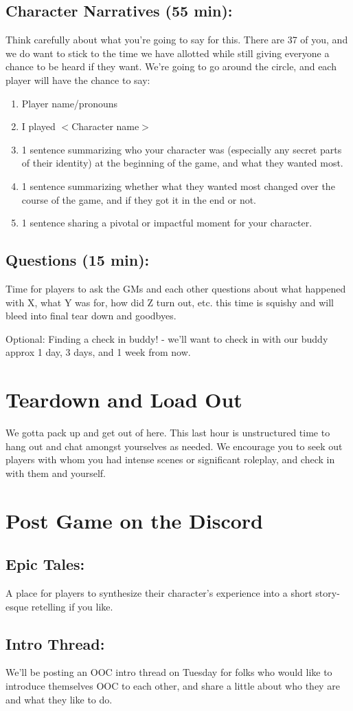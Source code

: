\documentclass[green]{GL2020}
\begin{document}
\subsection*{Character Narratives (55 min):}
Think carefully about what you’re going to say for this. There are 37 of you, and we do want to stick to the time we have allotted while still giving everyone a chance to be heard if they want. We’re going to go around the circle, and each player will have the chance to say:
\begin{enumerate}
	\item Player name/pronouns
	\item I played $<$Character name$>$
	\item 1 sentence summarizing who your character was (especially any secret parts of their identity) at the beginning of the game, and what they wanted most.
	\item 1 sentence summarizing whether what they wanted most changed over the course of the game, and if they got it in the end or not. 
	\item 1 sentence sharing a pivotal or impactful moment for your character.
\end{enumerate}

\subsection*{Questions (15 min):}
Time for players to ask the GMs and each other questions about what happened with X, what Y was for, how did Z turn out, etc. this time is squishy and will bleed into final tear down and goodbyes.

Optional: Finding a check in buddy! - we’ll want to check in with our buddy approx 1 day, 3 days, and 1 week from now.


\section*{Teardown and Load Out}
We gotta pack up and get out of here. This last hour is unstructured time to hang out and chat amongst yourselves as needed. We encourage you to seek out players with whom  you had intense scenes or significant roleplay, and check in with them and yourself.

\section*{Post Game on the Discord}

\subsection*{Epic Tales:}
A place for players to synthesize their character’s experience into a short story-esque retelling if you like.

\subsection*{Intro Thread:}
We’ll be posting an OOC intro thread on Tuesday for folks who would like to introduce themselves OOC to each other, and share a little about who they are and what they like to do.
\end{document}
